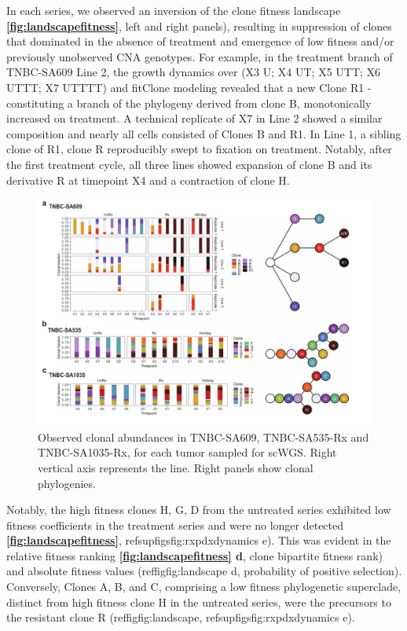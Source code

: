 In each series, we observed an inversion of the clone fitness landscape \textbf{\autoref{fig:landscapefitness}}, left and right panels), resulting in suppression of clones that dominated in the absence of treatment and emergence of low fitness and/or previously unobserved CNA genotypes. For example, in the treatment branch of TNBC-SA609 Line 2, the growth dynamics over (X3 U; X4 UT; X5 UTT; X6 UTTT; X7 UTTTT) and fitClone modeling revealed that a new Clone R1 - constituting a branch of the phylogeny derived from clone B,  monotonically increased on treatment. A technical replicate of X7 in Line 2 showed a similar composition and nearly all cells consisted of Clones B and R1.  In Line 1, a sibling clone of R1, clone R reproducibly swept to fixation on treatment. Notably, after the first treatment cycle, all three lines showed expansion of clone B and its derivative R at timepoint X4 and a contraction of clone H. 

\begin{figure}
\centering
\includegraphics[width=\textwidth]{Figures/All3barplots.pdf}
\caption[Summary of number of genes \textit{in-cis} and \textit{in-trans}]
	{\small
	\textbf{}
	Observed clonal abundances in TNBC-SA609, TNBC-SA535-Rx and TNBC-SA1035-Rx, for each tumor sampled for scWGS. Right vertical axis represents the line. Right panels show clonal phylogenies.
}
    \label{fig:All3barplots}
    \end{figure}

Notably, the high fitness clones H, G, D from the untreated series exhibited low fitness coefficients in the treatment series and were no longer detected \textbf{\autoref{fig:landscapefitness}}, refsupfig{sfig:rxpdxdynamics} e). This was evident in the relative fitness ranking \textbf{\autoref{fig:landscapefitness} d}, clone bipartite fitness rank) and absolute fitness values (reffig{fig:landscape} d, probability of positive selection). Conversely, Clones A, B,  and C, comprising a low fitness phylogenetic superclade, distinct from high fitness clone H in the untreated series, were the precursors to the resistant clone R (reffig{fig:landscape}, refsupfig{sfig:rxpdxdynamics} e). 

